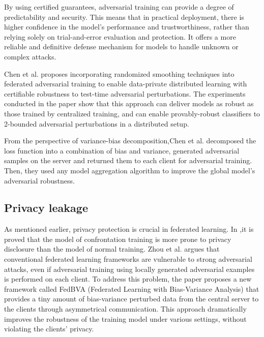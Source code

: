 \documentclass[conference]{IEEEtran}
\begin{document}
By using certified guarantees, adversarial training can provide a degree of predictability and security. 
This means that in practical deployment, there is higher confidence in the model's performance and trustworthiness, 
rather than relying solely on trial-and-error evaluation and protection. 
It offers a more reliable and definitive defense mechanism for models to handle unknown or complex attacks.  

Chen et al.\cite{b104} proposes incorporating randomized smoothing techniques into federated adversarial
training to enable data-private distributed learning with certifiable robustness to test-time adversarial
perturbations. The experiments conducted in the paper show that this approach can deliver models as
robust as those trained by centralized training, and can enable provably-robust classifiers to
2-bounded adversarial perturbations in a distributed setup.

From the perspective of variance-bias decomposition,Chen et al.\cite{b108} decomposed the 
loss function into a combination of bias and variance, generated adversarial samples on the server 
and returned them to each client for adversarial training. Then, they used any model aggregation 
algorithm to improve the global model's adversarial robustness.

\subsection{Privacy leakage} 
As mentioned earlier, privacy protection is crucial in federated learning.
In \cite{b106},it is proved that the model of confrontation training is more prone to
privacy disclosure than the model of normal training.
Zhou et al.\cite{b103} argues that conventional federated learning frameworks are vulnerable
to strong adversarial attacks, even if adversarial training using locally
generated adversarial examples is performed on each client. To address this
problem, the paper proposes a new framework called FedBVA (Federated Learning
with Bias-Variance Analysis) that provides a tiny amount of bias-variance
perturbed data from the central server to the clients through asymmetrical
communication. This approach dramatically improves the robustness of the
training model under various settings, without violating the clients' privacy.
\end{document}
